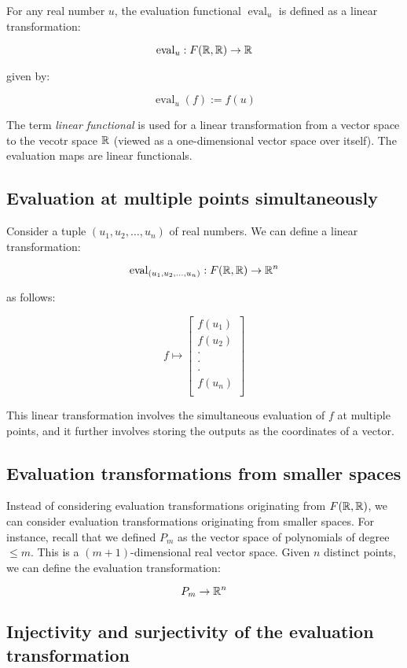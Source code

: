 \documentclass[10pt]{amsart}
\begin{document}
For any real number $u$, the evaluation functional
$\operatorname{eval}_u$ is defined as a linear transformation:

$$\operatorname{eval}_u: F(\mathbb{R},\mathbb{R}) \to \mathbb{R}$$

given by:

$$\operatorname{eval}_u(f) := f(u)$$

The term {\em linear functional} is used for a linear transformation
from a vector space to the vecotr space $\mathbb{R}$ (viewed as a
one-dimensional vector space over itself). The evaluation maps are
linear functionals.

\subsection{Evaluation at multiple points simultaneously}

Consider a tuple $(u_1,u_2,\dots,u_n)$ of real numbers. We can define
a linear transformation:

$$\operatorname{eval}_{(u_1,u_2,\dots,u_n)}:F(\mathbb{R},\mathbb{R}) \to \mathbb{R}^n$$

as follows:

$$f \mapsto \left[\begin{matrix} f(u_1) \\ f(u_2) \\ \cdot \\ \cdot \\ \cdot \\ f(u_n) \\\end{matrix}\right]$$

This linear transformation involves the simultaneous evaluation of $f$
at multiple points, and it further involves storing the outputs as the
coordinates of a vector.

\subsection{Evaluation transformations from smaller spaces}

Instead of considering evaluation transformations originating from
$F(\mathbb{R},\mathbb{R})$, we can consider evaluation transformations originating
from smaller spaces. For instance, recall that we defined $P_m$ as the
vector space of polynomials of degree $\le m$. This is a $(m +
1)$-dimensional real vector space. Given $n$ distinct points, we can
define the evaluation transformation:

$$P_m \to \mathbb{R}^n$$

\subsection{Injectivity and surjectivity of the evaluation transformation}
\end{document}
